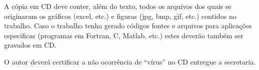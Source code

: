 A cópia em CD deve conter, além do texto, todos os arquivos dos quais se 
originaram os gráficos (excel, etc.) e figuras (jpg, bmp, gif, etc.) 
contidos no trabalho. Caso o trabalho tenha gerado códigos fontes e 
arquivos para aplicações especificas (programas em Fortran, C, Matlab, 
etc.) estes deverão também ser gravados em CD. 

O autor deverá certificar a não ocorrência de “vírus” no CD entregue a 
secretaria. 

